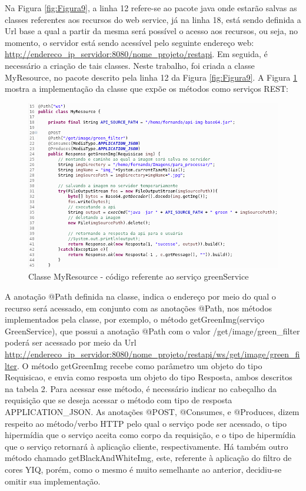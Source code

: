 \documentclass[12pt]{article}
\begin{document}
Na Figura \ref{fig:Figura9}, a linha 12 refere-se ao pacote java onde estarão salvas as classes referentes aos recursos do web service, já na linha 18, está sendo definida a Url base a qual a partir da mesma será possível o acesso aos recursos, ou seja, no momento, o servidor está sendo acessível pelo seguinte endereço web: \url{http://endereco_ip_servidor:8080/nome_projeto/restapi}.
Em seguida, é necessário a criação de tais classes. Neste trabalho, foi criada a classe MyResource, no pacote descrito pela linha 12 da Figura \ref{fig:Figura9}. A Figura \ref{fig:Figura10} mostra a implementação da classe que expõe os métodos como serviços REST:

\begin{figure}[ht]
	\centering
	\includegraphics[width=.9\textwidth]{codigo-green-service.png}
	\caption{Classe MyResource - código referente ao serviço greenService}
	\label{fig:Figura10}
\end{figure}

A anotação @Path definida na classe, indica o endereço por meio do qual o recurso será acessado, em conjunto com as anotações @Path, nos métodos implementados pela classe, por exemplo, o método getGreenImg(serviço GreenService), que possui a anotação @Path com o valor /get/image/green\_filter poderá ser acessado por meio da Url \url{http://endereco_ip_servidor:8080/nome_projeto/restapi/ws/get/image/green_filter}.
 O método getGreenImg recebe como parâmetro um objeto do tipo Requisicao, e envia como resposta um objeto do tipo Resposta, ambos descritos na tabela 2. Para acessar esse método, é necessário indicar no cabeçalho da requisição que se deseja acessar o método com tipo de resposta APPLICATION\_JSON. As anotações @POST, @Consumes, e @Produces, dizem respeito ao método/verbo HTTP pelo qual o serviço pode ser acessado, o tipo hipermídia que o serviço aceita como corpo da requisição, e o tipo de hipermídia que o serviço retornará à aplicação cliente, respectivamente. Há também outro método chamado getBlackAndWhiteImg, este, referente à aplicação do filtro de cores YIQ, porém, como o mesmo é muito semelhante ao anterior, decidiu-se omitir sua implementação.
\end{document}
